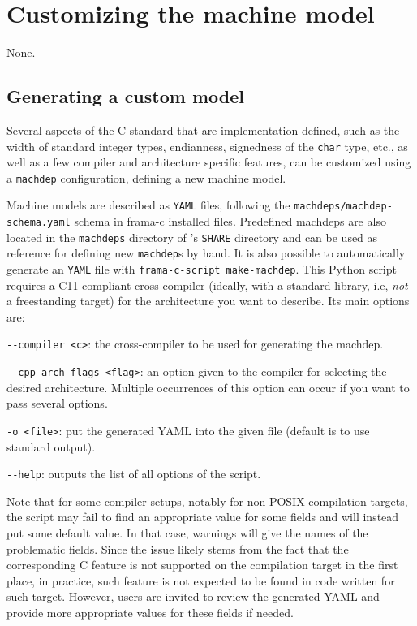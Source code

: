 
\section{Customizing the machine model}\label{sec:customizing-machdep}

\begin{prereq}
  None.
\end{prereq}

\subsection{Generating a custom model}\label{sec:gener-cust-model}
Several aspects of the C standard that are implementation-defined, such as
the width of standard integer types, endianness, signedness of the
\texttt{char} type, etc., as well as a few compiler and architecture specific
features, can be customized using a \texttt{machdep} configuration,
defining a new machine model.

Machine models are described as \texttt{YAML} files, following the
\texttt{machdeps/machdep-schema.yaml} schema in frama-c installed files.
Predefined machdeps are also located in the \texttt{machdeps} directory
of \framac's \texttt{SHARE} directory and can be used as reference for
defining new \texttt{machdep}s by hand. It is also possible to automatically
generate an \texttt{YAML} file with \texttt{frama-c-script make-machdep}.
This Python script requires a
C11-compliant cross-compiler (ideally, with a standard library, i.e, {\em not}
a freestanding target) for the architecture you want to describe.
Its main options are:
\begin{description}
\item \texttt{-{}-compiler <c>}: the cross-compiler to be used for generating
  the machdep.
\item \texttt{-{}-cpp-arch-flags <flag>}: an option given to the compiler for
selecting the desired architecture. Multiple occurrences of this option can
occur if you want to pass several options.
\item \texttt{-o <file>}: put the generated YAML into the given file (default
is to use standard output).
\item \texttt{-{}-help}: outputs the list of all options of the script.
\end{description}

Note that for some compiler setups, notably for non-POSIX compilation targets,
the script may fail to find an appropriate value for some fields and will
instead put some default value. In that case, warnings will give the names of
the problematic fields. Since the issue likely stems from the fact that the
corresponding C feature is not supported on the compilation target in the first
place, in practice, such feature is not expected to be found in code written for
such target. However, users are invited to review the generated YAML and
provide more appropriate values for these fields if needed.

